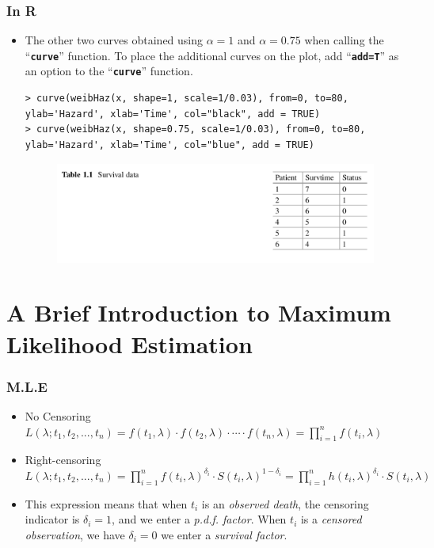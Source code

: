 \documentclass{beamer}
\newcommand{\empr}[1]{{\emph{\color{red}#1}}}
\newcommand{\pkg}[1]{{\textbf{\texttt{#1}}}}
\begin{document}
\pagebreak
\begin{frame}[fragile]
\frametitle{In R}
\begin{itemize}	
\item The other two curves obtained using $\alpha=1$ and $\alpha=0.75$ when calling the ``\pkg{curve}''  function. To place the additional curves on the plot, add ``\pkg{add=T}''  as an option to the ``\pkg{curve}''  function.
\begin{Verbatim}
> curve(weibHaz(x, shape=1, scale=1/0.03), from=0, to=80,
ylab='Hazard', xlab='Time', col="black", add = TRUE)
> curve(weibHaz(x, shape=0.75, scale=1/0.03), from=0, to=80,
ylab='Hazard', xlab='Time', col="blue", add = TRUE)
\end{Verbatim}

\begin{figure}
	\includegraphics[scale = .4]{001.png}
\end{figure}
\end{itemize}
\end{frame}

\section{A Brief Introduction to Maximum Likelihood Estimation}
\begin{frame}
\frametitle{M.L.E}
\begin{itemize}	
\item No Censoring	\linebreak
 $L(\lambda; t_1, t_2,...,t_n) = f(t_1,\lambda)\cdot f(t_2,\lambda)\cdot\cdots\cdot f(t_n,\lambda)= \prod\limits_{i=1}^{n} f(t_i,\lambda)$
\end{itemize}

\begin{itemize}	
\item Right-censoring
$L(\lambda; t_1, t_2,...,t_n) = \prod\limits_{i=1}^{n} f(t_i,\lambda)^{\delta_i}\cdot S(t_i,\lambda)^{1-\delta_i}= \prod\limits_{i=1}^{n}h(t_i,\lambda)^{\delta_i}\cdot S(t_i,\lambda)$
\end{itemize}
\begin{itemize}	
\item This expression means that when $t_i$ is an \empr{observed death}, the censoring indicator is \empr{$\delta_i = 1$}, and we enter a \empr{p.d.f. factor}. When $t_i$ is a \empr{censored observation}, we have \empr{$\delta_i = 0$} we enter a \empr{survival factor}. 
\end{itemize}
\end{frame}
\end{document}

